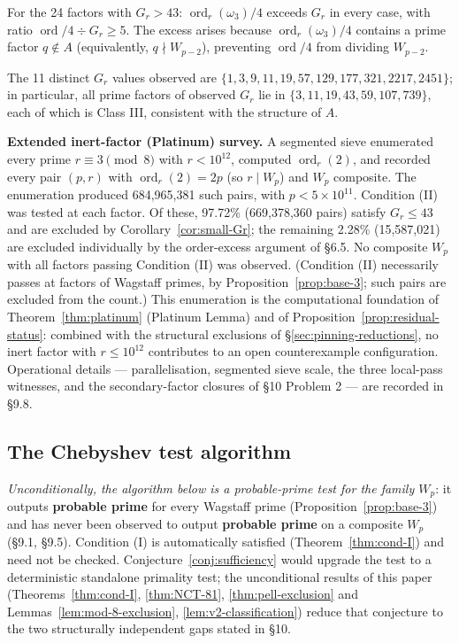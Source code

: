 \documentclass[12pt]{article}
\theoremstyle{plain}
\theoremstyle{definition}
\theoremstyle{remark}
\begin{document}
For the 24 factors with \(G_r > 43\):
\(\operatorname{ord}_r(\omega_3)/4\) exceeds \(G_r\) in every case,
with ratio \(\operatorname{ord}/4 \div G_r \geq 5\). The excess
arises because \(\operatorname{ord}_r(\omega_3)/4\) contains a prime
factor \(q \notin A\) (equivalently, \(q \nmid W_{p-2}\)), preventing
\(\operatorname{ord}/4\) from dividing \(W_{p-2}\).

The 11 distinct \(G_r\) values observed are
\(\{1, 3, 9, 11, 19, 57, 129, 177, 321, 2217, 2451\}\); in particular,
all prime factors of observed \(G_r\) lie in
\(\{3, 11, 19, 43, 59, 107, 739\}\), each of which is Class III,
consistent with the structure of \(A\).

\textbf{Extended inert-factor (Platinum) survey.} A segmented
sieve enumerated every prime \(r \equiv 3 \pmod{8}\) with
\(r < 10^{12}\), computed \(\operatorname{ord}_r(2)\), and
recorded every pair \((p,r)\) with
\(\operatorname{ord}_r(2) = 2p\) (so \(r \mid W_p\)) and \(W_p\)
composite. The enumeration produced 684{,}965{,}381 such pairs,
with \(p < 5 \times 10^{11}\). Condition (II) was tested at each
factor. Of these, 97.72\% (669{,}378{,}360 pairs) satisfy
\(G_r \leq 43\) and are excluded by Corollary~\ref{cor:small-Gr}; the remaining
2.28\% (15{,}587{,}021) are excluded individually by the
order-excess argument of \S6.5. No composite \(W_p\) with all
factors passing Condition (II) was observed. (Condition (II)
necessarily passes at factors of Wagstaff primes, by
Proposition~\ref{prop:base-3}; such pairs are excluded from the count.)
This enumeration is the computational foundation of
Theorem~\ref{thm:platinum} (Platinum Lemma) and of
Proposition~\ref{prop:residual-status}: combined with the
structural exclusions of \S\ref{sec:pinning-reductions}, no inert
factor with \(r \leq 10^{12}\) contributes to an open
counterexample configuration.
Operational details --- parallelisation, segmented sieve scale,
the three local-pass witnesses, and the secondary-factor closures
of \S10 Problem 2 --- are recorded in \S9.8.

\subsection{The Chebyshev test algorithm}


\emph{Unconditionally, the algorithm below is a probable-prime test for
the family \(W_p\)}: it outputs \textbf{probable prime} for every
Wagstaff prime (Proposition~\ref{prop:base-3}) and has never been observed to
output \textbf{probable prime} on a composite \(W_p\) (\S9.1, \S9.5).
Condition (I) is automatically satisfied (Theorem~\ref{thm:cond-I}) and need
not be checked. Conjecture~\ref{conj:sufficiency} would upgrade the test to a
deterministic standalone primality test; the unconditional results
of this paper (Theorems~\ref{thm:cond-I}, \ref{thm:NCT-81}, \ref{thm:pell-exclusion} and Lemmas~\ref{lem:mod-8-exclusion}, \ref{lem:v2-classification}) reduce
that conjecture to the two structurally independent gaps stated in
\S10.
\end{document}

